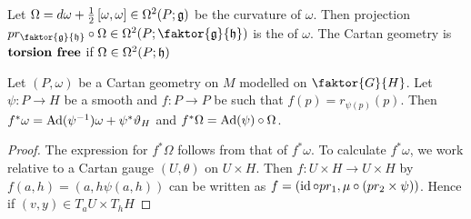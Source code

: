 \documentclass{article}
\begin{document}
\begin{definition}
Let $\Omega = d\omega + \frac{1}{2} \left[ \omega, \omega \right]\in \Omega^2(P;\mathfrak{g})$ be the curvature of $\omega$. Then projection $pr_{\faktor{\mf{g}}{\mf{h}}}\circ \Omega \in \Omega^2(P;\faktor{\mf{g}}{\mf{h}})$ is the  of $\omega$. The Cartan geometry is $\textbf{torsion free}$ if $\Omega \in \Omega^2(P;\mathfrak{h})$
\end{definition}

\begin{lemma}
Let $(P,\omega)$ be a Cartan geometry on $M$ modelled on $\faktor{G}{H}$. Let $\psi : P \to H$ be a smooth and $f : P \to  P $ be such that $f(p) = r_{\psi(p)}(p)$. Then $f^\ast \omega = \operatorname{Ad}(\psi^{-1})\omega + \psi^\ast \vartheta_H$ and $f^\ast \Omega = \operatorname{Ad}(\psi) \circ \Omega$.
\end{lemma}
\begin{proof}
The expression for $f^\ast \Omega$ follows from that of $f^\ast \omega$. To calculate $f^\ast \omega$, we work relative to a Cartan gauge $(U,\theta)$ on $U \times H$. Then $f: U \times H \to U \times H$ by $f(a,h) = (a,h\psi(a,h))$ can be written as $f = (\operatorname{id} \circ pr_1, \mu \circ (pr_2 \times \psi))$. Hence if $(v,y) \in T_aU \times T_hH$
\end{proof}
\end{document}
